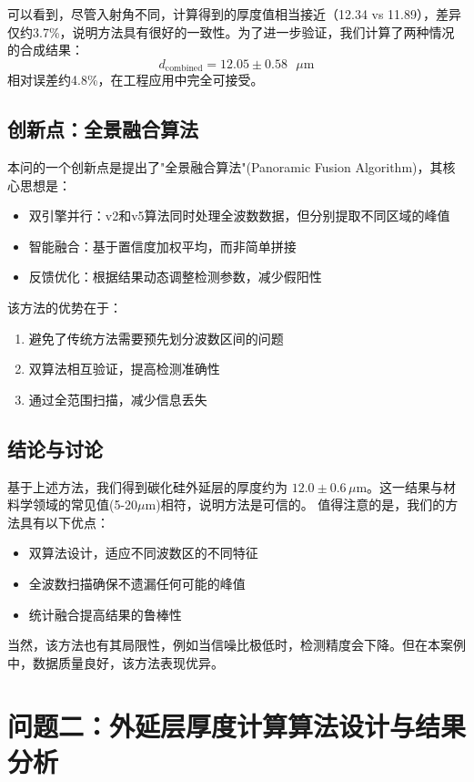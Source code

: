 \documentclass{ctexart} %
\begin{document}
可以看到，尽管入射角不同，计算得到的厚度值相当接近（12.34 vs 11.89），差异仅约3.7\%，说明方法具有很好的一致性。为了进一步验证，我们计算了两种情况的合成结果：
\begin{equation}
    d_{\text{combined}} = 12.05 \pm 0.58 \text{ }\mu\mathrm{m}
\end{equation}
相对误差约4.8\%，在工程应用中完全可接受。

\subsection{创新点：全景融合算法}
\label{subsection:innovation}
本问的一个创新点是提出了"全景融合算法"(Panoramic Fusion Algorithm)，其核心思想是：
\begin{itemize}
    \item 双引擎并行：v2和v5算法同时处理全波数数据，但分别提取不同区域的峰值
    \item 智能融合：基于置信度加权平均，而非简单拼接
    \item 反馈优化：根据结果动态调整检测参数，减少假阳性
\end{itemize}

该方法的优势在于：
\begin{enumerate}
    \item 避免了传统方法需要预先划分波数区间的问题
    \item 双算法相互验证，提高检测准确性
    \item 通过全范围扫描，减少信息丢失
\end{enumerate}

\subsection{结论与讨论}
\label{subsec:discussion}
基于上述方法，我们得到碳化硅外延层的厚度约为 $12.0\pm 0.6\,\mu\mathrm{m}$。这一结果与材料学领域的常见值(5-20$\mu$m)相符，说明方法是可信的。 值得注意的是，我们的方法具有以下优点：
\begin{itemize}
    \item 双算法设计，适应不同波数区的不同特征
    \item 全波数扫描确保不遗漏任何可能的峰值
    \item 统计融合提高结果的鲁棒性
\end{itemize} 当然，该方法也有其局限性，例如当信噪比极低时，检测精度会下降。但在本案例中，数据质量良好，该方法表现优异。

\section{问题二：外延层厚度计算算法设计与结果分析}
\end{document}
